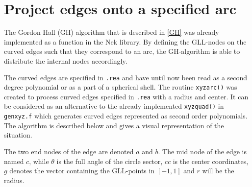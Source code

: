 \section{Project edges onto a specified arc} \label{xyzarc}

The Gordon Hall (GH) algorithm that is described in \cref{GH} was already implemented as a function in the Nek library.
By defining the GLL-nodes on the curved edges such that they correspond to an arc, the GH-algorithm is able to distribute 
the internal nodes accordingly. 

The curved edges are specified in \verb|.rea| and have until now been read as a second degree polynomial or as a part of a 
spherical shell. The routine \verb|xyzarc()| was created to process curved edges specified in \verb|.rea| with a radius and center.
It can be considered as an alternative to the already implemented \verb|xyzquad()| in \verb|genxyz.f| which generates curved edges 
represented as second order polynomials.
The algorithm is described below and  gives a visual representation of the situation.

The two end nodes of the edge are denoted $a$ and $b$. 
The mid node of the edge is named $c$, while 
$\theta$ is the full angle of the circle sector,
$cc$ is the center coordinates, 
$g$ denotes the vector containing the GLL-points in $[-1,1]$ 
and $r$ will be the radius.

